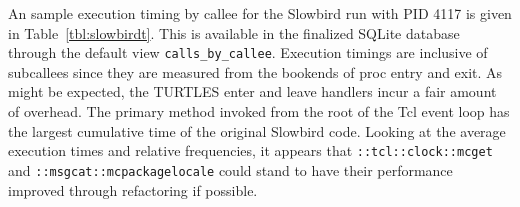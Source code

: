 \documentclass{article}[letter,10pt]
\begin{document}
{{{        An sample execution timing by callee for the Slowbird run with PID 4117 is given in Table~\ref{tbl:slowbirdt}.
        This is available in the finalized SQLite database through the default view \texttt{calls\_by\_callee}.
        Execution timings are inclusive of subcallees since they are measured from the bookends of proc
        entry and exit. As might be expected, the TURTLES enter and leave handlers incur a fair amount of overhead.
        The primary method invoked from the root of the Tcl event loop has the largest cumulative time of the
        original Slowbird code. Looking at the average execution times and relative frequencies, it appears
        that \texttt{::tcl::clock::mcget} and \texttt{::msgcat::mcpackagelocale} could stand to have their performance
        improved through refactoring if possible.

}}}
\end{document}
